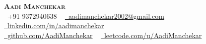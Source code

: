 \documentclass[letterpaper,11pt]{article}
\begin{document}
\begin{center}
    \textbf{\LARGE \scshape Aadi Manchekar} \\ \vspace{1pt}
    \small
    \raisebox{-0.1\height}{\faPhone}~+91 9372940638 ~
    \href{mailto:aadimanchekar2002@gmail.com}{\raisebox{-0.2\height}{\faEnvelope}~aadimanchekar2002@gmail.com} ~
    \href{https://www.linkedin.com/in/aadimanchekar/}{\raisebox{-0.2\height}{\faLinkedin}~linkedin.com/in/aadimanchekar}
    \\[2pt]
    \small
    \href{https://github.com/AadiManchekar}{\raisebox{-0.2\height}{\faGithub}~github.com/AadiManchekar} ~
    \href{https://leetcode.com/u/AadiManchekar/}{\raisebox{-0.2\height}{\faCode}~leetcode.com/u/AadiManchekar}
    \vspace{-8pt}
\end{center}


\end{document}
